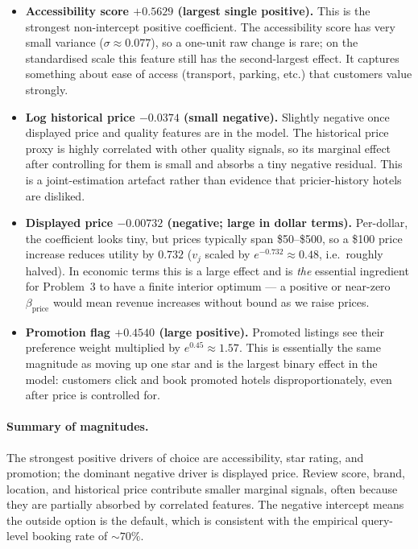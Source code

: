 \documentclass[11pt]{article}
\begin{document}
\begin{itemize}
    Expedia's location score barely moves the choice. The near-zero
    coefficient indicates location is largely already proxied by the
    other features and adds little marginal signal.
  \item \textbf{Accessibility score $+0.5629$ (largest single positive).}
    This is the strongest non-intercept positive coefficient. The
    accessibility score has very small variance ($\sigma \approx 0.077$),
    so a one-unit raw change is rare; on the standardised scale this
    feature still has the second-largest effect. It captures something
    about ease of access (transport, parking, etc.) that customers value
    strongly.
  \item \textbf{Log historical price $-0.0374$ (small negative).}
    Slightly negative once displayed price and quality features are in
    the model. The historical price proxy is highly correlated with
    other quality signals, so its marginal effect after controlling for
    them is small and absorbs a tiny negative residual. This is a
    joint-estimation artefact rather than evidence that pricier-history
    hotels are disliked.
  \item \textbf{Displayed price $-0.00732$ (negative; large in dollar
    terms).}
    Per-dollar, the coefficient looks tiny, but prices typically span
    \$50--\$500, so a \$100 price increase reduces utility by
    $0.732$ ($v_j$ scaled by $e^{-0.732}\approx 0.48$, i.e.\ roughly
    halved). In economic terms this is a large effect and is
    \emph{the} essential ingredient for Problem~3 to have a finite
    interior optimum --- a positive or near-zero $\beta_{\text{price}}$
    would mean revenue increases without bound as we raise prices.
  \item \textbf{Promotion flag $+0.4540$ (large positive).}
    Promoted listings see their preference weight multiplied by
    $e^{0.45}\approx 1.57$. This is essentially the same magnitude as
    moving up one star and is the largest binary effect in the model:
    customers click and book promoted hotels disproportionately, even
    after price is controlled for.
\end{itemize}

\paragraph{Summary of magnitudes.}
The strongest positive drivers of choice are accessibility, star rating,
and promotion; the dominant negative driver is displayed price. Review
score, brand, location, and historical price contribute smaller marginal
signals, often because they are partially absorbed by correlated
features. The negative intercept means the outside option is the
default, which is consistent with the empirical query-level booking
rate of $\sim 70\%$.
\end{document}
